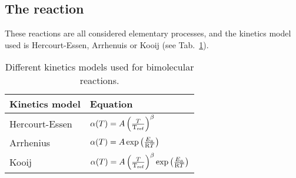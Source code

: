 \subsection{The reaction}
\begin{chemequation}
\end{chemequation}

These reactions are all considered elementary processes, and
the kinetics model used is Hercourt-Essen, Arrhenuis or Kooij
(see Tab.~\ref{Titan_bimol_kin}).
\begin{table}
\centering
\renewcommand{\arraystretch}{2}
\begin{tabular}{ll}\toprule
Kinetics model & Equation \\\midrule
Hercourt-Essen & $\alpha(T) = A \left(\frac{T}{\mathrm{T_{ref}}}\right)^{\beta}$ \\
Arrhenius      & $\alpha(T) = A \exp\left(\frac{E_a}{\mathrm{R} T}\right)$ \\
Kooij          & $\alpha(T) = A \left(\frac{T}{\mathrm{T_{ref}}}\right)^{\beta}\exp\left(\frac{E_a}{\mathrm{R} T}\right)$ \\
\bottomrule
\end{tabular}
\caption{\label{Titan_bimol_kin}Different kinetics models used for bimolecular reactions.}
\end{table}
